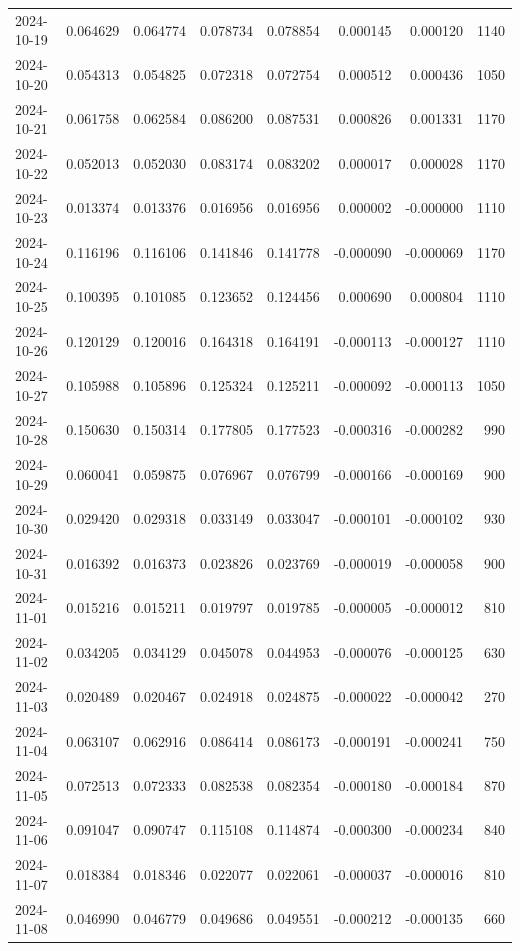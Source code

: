 \begin{tabular}{lrrrrrrr}
2024-10-19 & 0.064629 & 0.064774 & 0.078734 & 0.078854 & 0.000145 & 0.000120 & 1140 \\
2024-10-20 & 0.054313 & 0.054825 & 0.072318 & 0.072754 & 0.000512 & 0.000436 & 1050 \\
2024-10-21 & 0.061758 & 0.062584 & 0.086200 & 0.087531 & 0.000826 & 0.001331 & 1170 \\
2024-10-22 & 0.052013 & 0.052030 & 0.083174 & 0.083202 & 0.000017 & 0.000028 & 1170 \\
2024-10-23 & 0.013374 & 0.013376 & 0.016956 & 0.016956 & 0.000002 & -0.000000 & 1110 \\
2024-10-24 & 0.116196 & 0.116106 & 0.141846 & 0.141778 & -0.000090 & -0.000069 & 1170 \\
2024-10-25 & 0.100395 & 0.101085 & 0.123652 & 0.124456 & 0.000690 & 0.000804 & 1110 \\
2024-10-26 & 0.120129 & 0.120016 & 0.164318 & 0.164191 & -0.000113 & -0.000127 & 1110 \\
2024-10-27 & 0.105988 & 0.105896 & 0.125324 & 0.125211 & -0.000092 & -0.000113 & 1050 \\
2024-10-28 & 0.150630 & 0.150314 & 0.177805 & 0.177523 & -0.000316 & -0.000282 & 990 \\
2024-10-29 & 0.060041 & 0.059875 & 0.076967 & 0.076799 & -0.000166 & -0.000169 & 900 \\
2024-10-30 & 0.029420 & 0.029318 & 0.033149 & 0.033047 & -0.000101 & -0.000102 & 930 \\
2024-10-31 & 0.016392 & 0.016373 & 0.023826 & 0.023769 & -0.000019 & -0.000058 & 900 \\
2024-11-01 & 0.015216 & 0.015211 & 0.019797 & 0.019785 & -0.000005 & -0.000012 & 810 \\
2024-11-02 & 0.034205 & 0.034129 & 0.045078 & 0.044953 & -0.000076 & -0.000125 & 630 \\
2024-11-03 & 0.020489 & 0.020467 & 0.024918 & 0.024875 & -0.000022 & -0.000042 & 270 \\
2024-11-04 & 0.063107 & 0.062916 & 0.086414 & 0.086173 & -0.000191 & -0.000241 & 750 \\
2024-11-05 & 0.072513 & 0.072333 & 0.082538 & 0.082354 & -0.000180 & -0.000184 & 870 \\
2024-11-06 & 0.091047 & 0.090747 & 0.115108 & 0.114874 & -0.000300 & -0.000234 & 840 \\
2024-11-07 & 0.018384 & 0.018346 & 0.022077 & 0.022061 & -0.000037 & -0.000016 & 810 \\
2024-11-08 & 0.046990 & 0.046779 & 0.049686 & 0.049551 & -0.000212 & -0.000135 & 660 \\

\end{tabular}
